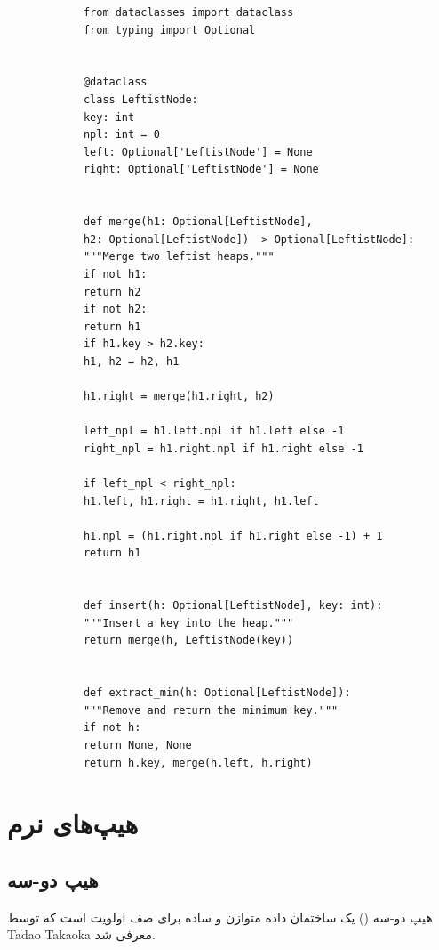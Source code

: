 \documentclass{matinbook}
\begin{document}
    \begin{latin}
        \begin{verbatim}
            from dataclasses import dataclass
            from typing import Optional
            
            
            @dataclass
            class LeftistNode:
            key: int
            npl: int = 0
            left: Optional['LeftistNode'] = None
            right: Optional['LeftistNode'] = None
            
            
            def merge(h1: Optional[LeftistNode],
            h2: Optional[LeftistNode]) -> Optional[LeftistNode]:
            """Merge two leftist heaps."""
            if not h1:
            return h2
            if not h2:
            return h1
            if h1.key > h2.key:
            h1, h2 = h2, h1
            
            h1.right = merge(h1.right, h2)
            
            left_npl = h1.left.npl if h1.left else -1
            right_npl = h1.right.npl if h1.right else -1
            
            if left_npl < right_npl:
            h1.left, h1.right = h1.right, h1.left
            
            h1.npl = (h1.right.npl if h1.right else -1) + 1
            return h1
            
            
            def insert(h: Optional[LeftistNode], key: int):
            """Insert a key into the heap."""
            return merge(h, LeftistNode(key))
            
            
            def extract_min(h: Optional[LeftistNode]):
            """Remove and return the minimum key."""
            if not h:
            return None, None
            return h.key, merge(h.left, h.right)
        \end{verbatim}
    \end{latin}
    \label{code:leftist-heap}
    
    \section{هیپ‌های نرم}
    
    \subsection{هیپ دو-سه}
    
    هیپ دو-سه
    () یک ساختمان داده
    متوازن و ساده برای صف اولویت است
    که توسط Tadao Takaoka معرفی شد.
    
\end{document}
